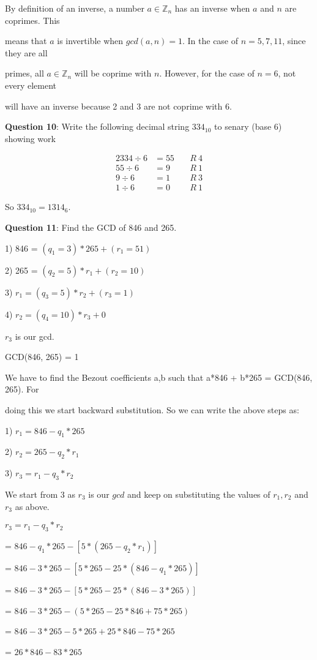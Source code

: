 \documentclass{article} %
\newcommand{\question}[2][]{\begin{flushleft}
        \textbf{Question #1}: #2

\end{flushleft}}
\begin{document}
    By definition of an inverse, a number $a \in \mathbb{Z}_n$ has an inverse when $a$ and $n$ are coprimes. This 
    
    means that $a$ is invertible when $gcd(a, n) = 1$. In the case of $n = 5, 7, 11$, since they are all 
    
    primes, all $a \in \mathbb{Z}_n$ will be coprime with $n$. However, for the case of $n = 6$, not every element 
    
    will have an inverse because 2 and 3 are not coprime with 6.

    \question[10]{Write the following decimal string $334_{10}$ to senary (base 6) showing work}
    \begin{alignat*}{2}
        334 \div 6 &= 55\ &&R\ 4\\
        55  \div 6 &= 9   &&R\ 1\\
        9   \div 6 &= 1   &&R\ 3\\
        1   \div 6 &= 0   &&R\ 1
    \end{alignat*}

    So $334_{10} = 1314_6$.

    \question[11]{Find the GCD of 846 and 265.}

    1) 846 = $(q_1 = 3) * 265 + (r_1 = 51)$

    2) 265 = $(q_2 = 5) * r_1 + (r_2 = 10)$

    3) $r_1 = (q_3 = 5) * r_2 + (r_3 = 1)$

    4) $r_2 = (q_4 = 10) * r_3 + 0$

    $r_3$ is our gcd.

    GCD(846, 265) = 1

    We have to find the Bezout coefficients a,b such that a*846 + b*265 = GCD(846, 265). For 
    
    doing this we start backward substitution. So we can write the above steps as:

    1) $r_1 = 846 - q_1*265$ 

    2) $r_2 = 265 - q_2*r_1$

    3) $r_3 = r_1 - q_3*r_2$

    We start from 3 as $r_3$ is our $gcd$ and keep on substituting the values of $r_1,r_2$ and $r_3$ as above. 

    $r_3 = r_1 - q_3*r_2$

    = $846 - q_1 * 265 - [5 * (265 - q_2 * r_1)]$

    = $846 - 3 * 265 - [5 * 265 - 25 * (846 - q_1 * 265)]$

    = $846 - 3 * 265 - [5 * 265 - 25 * (846 - 3 * 265)]$

    = $846 - 3 * 265 - (5 * 265 - 25 * 846 + 75 * 265)$

    = $846 - 3 * 265 - 5 * 265 + 25 * 846 - 75 * 265$

    = $26 * 846 - 83 * 265$
    
\end{document}
